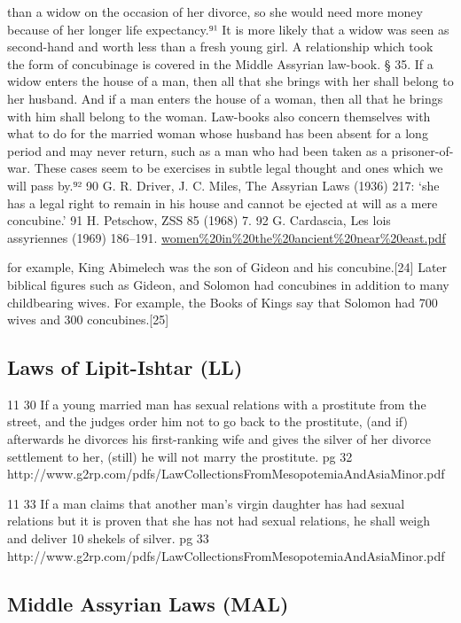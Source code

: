 \documentclass[11pt]{article}
\begin{document}
{than a widow on the occasion of her divorce, so she would need more money
because of her longer life expectancy.⁹¹ It is more likely that a widow was seen
as second-hand and worth less than a fresh young girl.
A relationship which took the form of concubinage is covered in the Middle
Assyrian law-book.
§ 35. If a widow enters the house of a man, then all that she brings with her shall belong to
her husband. And if a man enters the house of a woman, then all that he brings with him
shall belong to the woman.
Law-books also concern themselves with what to do for the married woman
whose husband has been absent for a long period and may never return, such as
a man who had been taken as a prisoner-of-war. These cases seem to be exercises
in subtle legal thought and ones which we will pass by.⁹²
90 G. R. Driver, J. C. Miles, The Assyrian Laws (1936) 217: ‘she has a legal right to remain in his
house and cannot be ejected at will as a mere concubine.’
91 H. Petschow, ZSS 85 (1968) 7.
92 G. Cardascia, Les lois assyriennes (1969) 186–191.
\url{women\%20in\%20the\%20ancient\%20near\%20east.pdf}


for example, King Abimelech was the son of Gideon and his concubine.[24] Later biblical figures such as Gideon, and Solomon had concubines in addition to many childbearing wives. For example, the Books of Kings say that Solomon had 700 wives and 300 concubines.[25]


\subsection{Laws of Lipit-Ishtar (LL)}
11 30 If a young married man has
sexual relations with a prostitute
from the street, and the judges
order him not to go back to the
prostitute, (and if) afterwards he
divorces his first-ranking wife and
gives the silver of her divorce settlement to her, (still) he will not
marry the prostitute. 
pg 32
http://www.g2rp.com/pdfs/LawCollectionsFromMesopotemiaAndAsiaMinor.pdf

11 33 If a man claims that another
man's virgin daughter has had sexual relations but it is proven that
she has not had sexual relations, he
shall weigh and deliver 10 shekels
of silver. 
pg 33
http://www.g2rp.com/pdfs/LawCollectionsFromMesopotemiaAndAsiaMinor.pdf

\subsection{Middle Assyrian Laws (MAL) }



}
\end{document}
